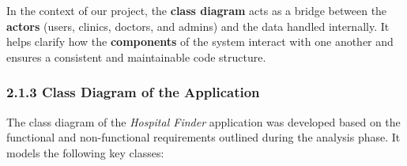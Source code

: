 \documentclass[12pt]{report}
\begin{document}
\noindent In the context of our project, the \textbf{class diagram} acts as a bridge between the \textbf{actors} (users, clinics, doctors, and admins) and the data handled internally. It helps clarify how the \textbf{components} of the system interact with one another and ensures a consistent and maintainable code structure.


\subsubsection*{2.1.3 Class Diagram of the Application}
\vspace{0.1cm}


The class diagram of the \textit{Hospital Finder} application was developed based on the functional and non-functional requirements outlined during the analysis phase. It models the following key classes:
\end{document}
